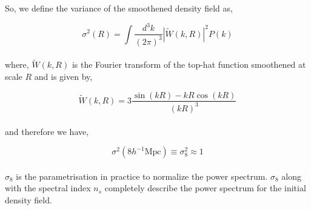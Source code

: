 \documentclass[
  11pt,
  twoside,
  openright,
  titlepage,
  headings=optiontoheadandtoc
]{scrbook}
\begin{document}
So, we define the variance of the smoothened density field as,

\begin{equation}
	\sigma^2(R) = \int \dfrac{d^3k}{(2\pi)^3} |\tilde{W}(k,R)|^2 P(k)
\end{equation}
\\
where, $\tilde{W}(k,R)$ is the Fourier transform of the top-hat function smoothened 
at scale $R$ and is given by,

\begin{equation}
	\tilde{W}(k,R) = 3\dfrac{\sin(kR) - kR \cos(kR)}{(kR)^3}
\end{equation}
\\
and therefore we have,

\begin{equation}
	\sigma^2(8 h^{-1} \mathrm{Mpc}) \equiv \sigma_8^2 \approx 1
\end{equation}
\\
$\sigma_8$ is the parametrisation in practice to normalize the power
spectrum. $\sigma_8$ along with the spectral index $n_s$ completely
describe the power spectrum for the initial density field.
\end{document}
